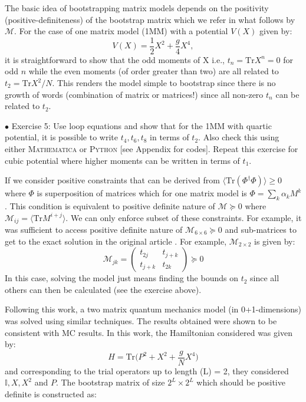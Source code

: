\documentclass[11pt]{article}
\newcommand{\MA}{\textsc{Mathematica }}
\newcommand{\PY}{\textsc{Python }}
\begin{document}
The basic idea of bootstrapping matrix models depends on the 
positivity (positive-definiteness) of the bootstrap matrix which we refer in what follows 
by $\mathcal{M}$. For the case of one matrix model (1MM) with a potential $V(X)$ given by: 
\begin{equation}
    V(X) = \frac12 X^2 + \frac{g}{4} X^4, 
\end{equation}
it is straightforward to show that the odd moments of X i.e., $ t_{n} = \mbox{Tr} X^n = 0$ for odd $n$
while the even moments (of order greater than two) are all related to $t_{2} = \mbox{Tr} X^2/N$. This renders the 
model simple to bootstrap since there is no growth of words (combination of matrix or matrices!)
since all non-zero $t_{n}$ can be related to $t_{2}$. 
\begin{mdframed}[backgroundcolor=blue!3] 
	\textsc{} 
	$\bullet$ Exercise 5: Use loop equations and show that for the 1MM with quartic potential, it is possible to write $t_{4}, t_{6}, t_{8}$ in terms of $t_{2}$. 
	Also check this using either \MA or \PY [see Appendix for codes]. Repeat this exercise for cubic potential where higher moments can be written in terms of $t_1$.  
\end{mdframed} 
If we consider positive constraints that can be derived from $\langle \mbox{Tr}(\Phi^{\dagger}\Phi) \rangle \ge 0 $
where $\Phi$ is superposition of matrices which for one matrix model is 
$ \Phi = \sum_{k} \alpha_{k} M^{k}$. This condition is equivalent to positive definite nature of
$\mathcal{M} \succeq 0 $ where $ \mathcal{M}_{ij} = \langle \mbox{Tr} M^{i+j} \rangle$. 
We can only enforce subset of these constraints. For example, it was sufficient to 
access positive definite nature of $\mathcal{M}_{6 \times 6} \succeq 0 $ and sub-matrices 
to get to the exact solution in the original article \cite{Lin:2020mme}. 
For example, $\mathcal{M}_{2 \times 2}$ is given by:
\begin{equation}
	\mathcal{M}_{jk} = 
	\begin{pmatrix}
		t_{2j} & t_{j+k}  \\
		t_{j+k} & t_{2k}  
	\end{pmatrix}  \succeq 0
\end{equation}
In this case, solving the model just means finding the bounds on $t_{2}$ since all others can then be calculated (see the exercise above). 

Following this work, a two matrix quantum mechanics 
model (in 0+1-dimensions) was solved using similar techniques. 
The results obtained were shown to be consistent with MC results. 
In this work, the Hamiltonian considered was given by:
\begin{equation}
H = \mbox{Tr} \Big( P^2 + X^2 + \frac{g}{N} X^4 \Big)
\end{equation}
and corresponding to the trial operators up to length (L) = 2, 
they considered $ \mathbb{I}, X, X^{2}$ and $P$. The bootstrap matrix
of size $2^L \times 2^L$ which should be positive definite is constructed as:
\end{document}
